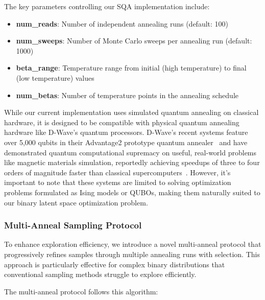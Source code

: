 \documentclass[10pt,twocolumn,letterpaper]{article}
\begin{document}
The key parameters controlling our SQA implementation include:
\begin{itemize}
    \item \textbf{num\_reads}: Number of independent annealing runs (default: 100)
    \item \textbf{num\_sweeps}: Number of Monte Carlo sweeps per annealing run (default: 1000)
    \item \textbf{beta\_range}: Temperature range from initial (high temperature) to final (low temperature) values
    \item \textbf{num\_betas}: Number of temperature points in the annealing schedule
\end{itemize}

While our current implementation uses simulated quantum annealing on classical hardware, it is designed to be compatible with physical quantum annealing hardware like D-Wave's quantum processors. D-Wave's recent systems feature over 5,000 qubits in their Advantage2 prototype quantum annealer~\cite{dwave2025beyond} and have demonstrated quantum computational supremacy on useful, real-world problems like magnetic materials simulation, reportedly achieving speedups of three to four orders of magnitude faster than classical supercomputers~\cite{dwave2025beyond}. However, it's important to note that these systems are limited to solving optimization problems formulated as Ising models or QUBOs, making them naturally suited to our binary latent space optimization problem.

\subsubsection{Multi-Anneal Sampling Protocol}
\label{sec:multi_anneal}

To enhance exploration efficiency, we introduce a novel multi-anneal protocol that progressively refines samples through multiple annealing runs with selection. This approach is particularly effective for complex binary distributions that conventional sampling methods struggle to explore efficiently.

The multi-anneal protocol follows this algorithm:
\end{document}

